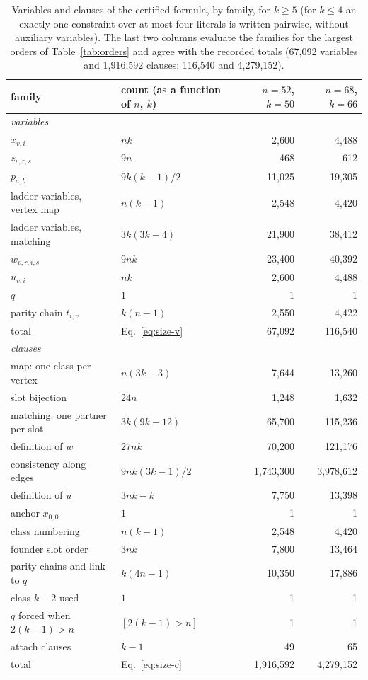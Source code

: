 \begin{table}[tbp]\centering\small
\begin{tabular}{llrr}
\toprule
family & count (as a function of $n$, $k$) & $n=52$, $k=50$ & $n=68$, $k=66$\\
\midrule
\multicolumn{4}{l}{\textit{variables}} \\
$x_{v,i}$ & $nk$ & 2{,}600 & 4{,}488 \\
$z_{v,r,s}$ & $9n$ & 468 & 612 \\
$p_{a,b}$ & $9k(k-1)/2$ & 11{,}025 & 19{,}305 \\
ladder variables, vertex map & $n(k-1)$ & 2{,}548 & 4{,}420 \\
ladder variables, matching & $3k(3k-4)$ & 21{,}900 & 38{,}412 \\
$w_{v,r,i,s}$ & $9nk$ & 23{,}400 & 40{,}392 \\
$u_{v,i}$ & $nk$ & 2{,}600 & 4{,}488 \\
$q$ & $1$ & 1 & 1 \\
parity chain $t_{i,v}$ & $k(n-1)$ & 2{,}550 & 4{,}422 \\
\midrule
total & Eq.~\eqref{eq:size-v} & 67{,}092 & 116{,}540 \\
\midrule
\multicolumn{4}{l}{\textit{clauses}} \\
map: one class per vertex & $n(3k-3)$ & 7{,}644 & 13{,}260 \\
slot bijection & $24n$ & 1{,}248 & 1{,}632 \\
matching: one partner per slot & $3k(9k-12)$ & 65{,}700 & 115{,}236 \\
definition of $w$ & $27nk$ & 70{,}200 & 121{,}176 \\
consistency along edges & $9nk(3k-1)/2$ & 1{,}743{,}300 & 3{,}978{,}612 \\
definition of $u$ & $3nk-k$ & 7{,}750 & 13{,}398 \\
anchor $x_{0,0}$ & $1$ & 1 & 1 \\
class numbering & $n(k-1)$ & 2{,}548 & 4{,}420 \\
founder slot order & $3nk$ & 7{,}800 & 13{,}464 \\
parity chains and link to $q$ & $k(4n-1)$ & 10{,}350 & 17{,}886 \\
class $k-2$ used & $1$ & 1 & 1 \\
$q$ forced when $2(k-1)>n$ & $[2(k-1)>n]$ & 1 & 1 \\
attach clauses & $k-1$ & 49 & 65 \\
\midrule
total & Eq.~\eqref{eq:size-c} & 1{,}916{,}592 & 4{,}279{,}152 \\
\bottomrule
\end{tabular}
\caption{Variables and clauses of the certified formula, by family, for $k \ge 5$ (for $k \le 4$ an exactly-one constraint over at most four literals is written pairwise, without auxiliary variables). The last two columns evaluate the families for the largest orders of Table~\ref{tab:orders} and agree with the recorded totals (67{,}092 variables and 1{,}916{,}592 clauses; 116{,}540 and 4{,}279{,}152).}\label{tab:counts}
\end{table}
